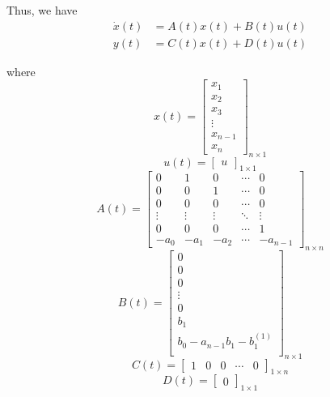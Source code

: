 Thus, we have
\[
    \begin{aligned}
        \dot{x}(t) & = A(t) x(t) + B(t) u(t) \\
        y(t)       & = C(t) x(t) + D(t) u(t)
    \end{aligned}
\]

where
\[
    x(t) =
    \begin{bmatrix}
        x_1     \\
        x_2     \\
        x_3     \\
        \vdots  \\
        x_{n-1} \\
        x_n
    \end{bmatrix}
    _{n \times 1}
\]
\[
    u(t) =
    \begin{bmatrix}
        u
    \end{bmatrix}
    _{1 \times 1}
\]
\[
    A(t) =
    \begin{bmatrix}
        0      & 1      & 0      & \cdots & 0        \\
        0      & 0      & 1      & \cdots & 0        \\
        0      & 0      & 0      & \cdots & 0        \\
        \vdots & \vdots & \vdots & \ddots & \vdots   \\
        0      & 0      & 0      & \cdots & 1        \\
        -a_0   & -a_1   & -a_2   & \cdots & -a_{n-1}
    \end{bmatrix}
    _{n \times n}
\]
\[
    B(t) =
    \begin{bmatrix}
        0                            \\
        0                            \\
        0                            \\
        \vdots                       \\
        0                            \\
        b_1                          \\
        b_0 - a_{n-1}b_1 - b_1^{(1)} \\
    \end{bmatrix}
    _{n \times 1}
\]
\[
    C(t) =
    \begin{bmatrix}
        1 & 0 & 0 & \cdots & 0
    \end{bmatrix}
    _{1 \times n}
\]
\[
    D(t) =
    \begin{bmatrix}
        0
    \end{bmatrix}
    _{1 \times 1}
\]


